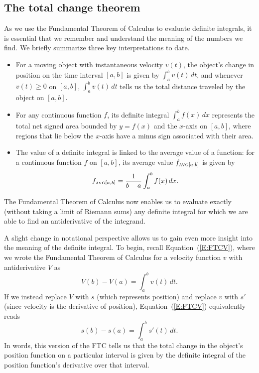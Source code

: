 \subsection*{The total change theorem} 

As we use the Fundamental Theorem of Calculus to evaluate definite integrals, it is essential that we remember and understand the meaning of the numbers we find.  We briefly summarize three key interpretations to date.
\begin{itemize}
	\item For a moving object with instantaneous velocity $v(t)$, the object's change in position on the time interval $[a,b]$ is given by $\int_a^b v(t) \, dt$, and whenever $v(t) \ge 0$ on $[a,b]$, $\int_a^b v(t) \, dt$ tells us the total distance traveled by the object on $[a,b]$.  
	\item For any continuous function $f$, its definite integral $\int_a^b f(x) \, dx$ represents the total net signed area bounded by $y = f(x)$ and the $x$-axis on $[a,b]$, where regions that lie below the $x$-axis have a minus sign associated with their area.  
	\item The value of a definite integral is linked to the average value of a function: for a continuous function $f$ on $[a,b]$, its average value $f_{\mbox{\tiny{AVG}}[a,b]}$ is given by
$$f_{\mbox{\tiny{AVG}}[a,b]} = \frac{1}{b-a} \int_a^b f(x) \, dx.$$
\end{itemize}
The Fundamental Theorem of Calculus now enables us to evaluate exactly (without taking a limit of Riemann sums) any definite integral for which we are able to find an antiderivative of the integrand.  

A slight change in notational perspective allows us to gain even more insight into the meaning of the definite integral.  To begin, recall Equation~(\ref{E:FTCV}), where we wrote the Fundamental Theorem of Calculus for a velocity function $v$ with antiderivative $V$ as
$$V(b) - V(a) = \int_a^b v(t) \, dt.$$
If we instead replace $V$ with $s$ (which represents position) and replace $v$ with $s'$ (since velocity is the derivative of position), Equation~(\ref{E:FTCV}) equivalently reads 
\begin{equation} \label{E:FTCs}
s(b) - s(a) = \int_a^b s'(t) \, dt.
\end{equation}
In words, this version of the FTC tells us that the total change in the object's position function on a particular interval is given by the definite integral of the position function's derivative over that interval.

